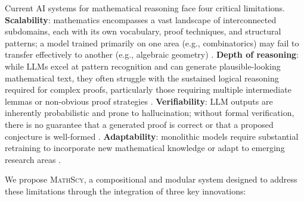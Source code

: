 \documentclass[11pt,a4paper]{article}
\newcommand{\mathscy}{\textsc{MathScy}}
\begin{document}
Current AI systems for mathematical reasoning face four critical limitations. \textbf{Scalability}: mathematics encompasses a vast landscape of interconnected subdomains, each with its own vocabulary, proof techniques, and structural patterns; a model trained primarily on one area (e.g., combinatorics) may fail to transfer effectively to another (e.g., algebraic geometry) \citep{gururangan2020dont}. \textbf{Depth of reasoning}: while LLMs excel at pattern recognition and can generate plausible-looking mathematical text, they often struggle with the sustained logical reasoning required for complex proofs, particularly those requiring multiple intermediate lemmas or non-obvious proof strategies \citep{achiam2024gpt4, lewkowycz2022minerva}. \textbf{Verifiability}: LLM outputs are inherently probabilistic and prone to hallucination; without formal verification, there is no guarantee that a generated proof is correct or that a proposed conjecture is well-formed \citep{polu2020generative}. \textbf{Adaptability}: monolithic models require substantial retraining to incorporate new mathematical knowledge or adapt to emerging research areas \citep{ke2023continual}.

We propose \mathscy{}, a compositional and modular system designed to address these limitations through the integration of three key innovations:
\end{document}
